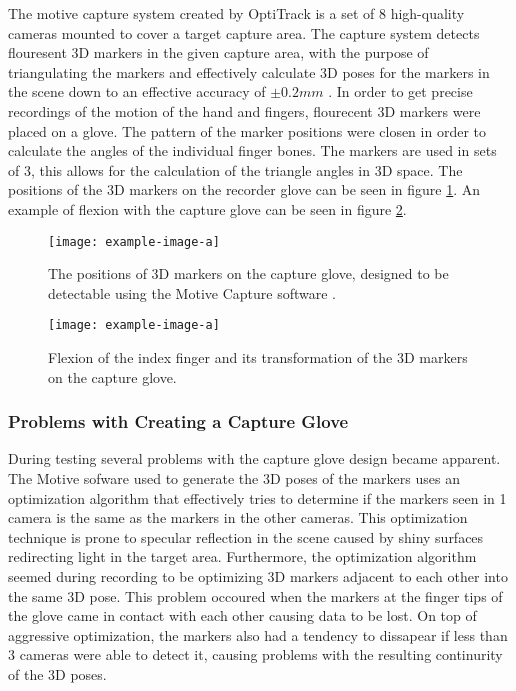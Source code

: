 \documentclass[../main.tex]{subfiles}
\begin{document}
The motive capture system created by OptiTrack is a set of 8 high-quality cameras mounted to cover a target capture area.
The capture system detects flouresent 3D markers in the given capture area, with the purpose of triangulating the markers and effectively calculate 3D poses for the markers in the scene down to an effective accuracy of $\pm 0.2mm$ \cite{motive}.
In order to get precise recordings of the motion of the hand and fingers, flourecent 3D markers were placed on a glove.
The pattern of the marker positions were closen in order to calculate the angles of the individual finger bones.
The markers are used in sets of 3, this allows for the calculation of the triangle angles in 3D space.
The positions of the 3D markers on the recorder glove can be seen in figure \ref{fig:glove}.
An example of flexion with the capture glove can be seen in figure \ref{fig:glove_flex}.


\begin{center}
\begin{figure}[h]
\texttt{[image: example-image-a]}
\caption{The positions of 3D markers on the capture glove, designed to be detectable using the  Motive Capture software \cite{motive}.}
\label{fig:glove}
\end{figure}
\end{center}

\begin{center}
\begin{figure}[h]
\texttt{[image: example-image-a]}
\caption{Flexion of the index finger and its transformation of the 3D markers on the capture glove.}
\label{fig:glove_flex}
\end{figure}
\end{center}

\subsubsection{Problems with Creating a Capture Glove}

During testing several problems with the capture glove design became apparent.
The Motive sofware used to generate the 3D poses of the markers uses an optimization algorithm that effectively tries to determine if the markers seen in 1 camera is the same as the markers in the other cameras.
This optimization technique is prone to specular reflection in the scene caused by shiny surfaces redirecting light in the target area.
Furthermore, the optimization algorithm seemed during recording to be optimizing 3D markers adjacent to each other into the same 3D pose.
This problem occoured when the markers at the finger tips of the glove came in contact with each other causing data to be lost.
On top of aggressive optimization, the markers also had a tendency to dissapear if less than 3 cameras were able to detect it, causing problems with the resulting continurity of the 3D poses. 
\end{document}
